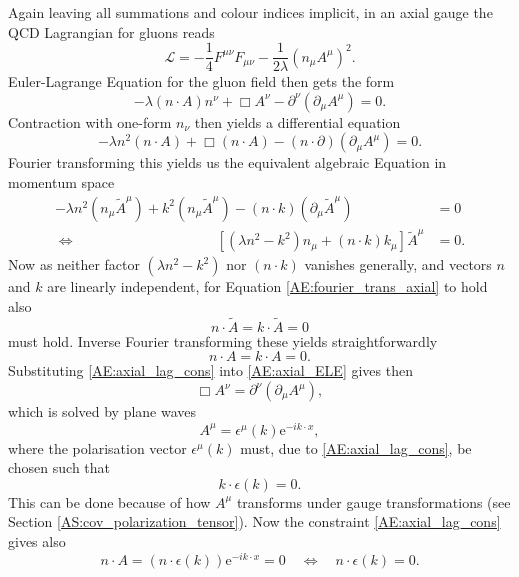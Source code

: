 \documentclass[a4paper, twoside, english, 12pt]{report}
\begin{document}
Again leaving all summations and colour indices implicit, in an axial gauge the QCD Lagrangian for gluons reads
\begin{equation}
	\mathcal{L} = - \frac{1}{4}F^{\mu\nu}F_{\mu\nu} - \frac{1}{2\lambda}(n_\mu A^\mu)^2.
\end{equation}
Euler-Lagrange Equation for the gluon field then gets the form
\begin{equation}\label{AE:axial_ELE}
	-\lambda\left(n\cdot A\right)n^\nu + \Box A^\nu -\partial^\nu\left(\partial_\mu A^\mu\right)= 0.
\end{equation}
Contraction with one-form $n_\nu$ then yields a differential equation
\begin{equation}
-\lambda n^2\left(n\cdot A\right) + \Box \left(n\cdot A\right) -\left(n\cdot\partial\right)\left(\partial_\mu A^\mu\right)= 0.
\end{equation}
Fourier transforming this yields us the equivalent algebraic Equation in momentum space
\begin{align}\label{AE:fourier_trans_axial}
-\lambda n^2\left(n_\mu \tilde{A}^\mu\right) + k^2 \left(n_\mu \tilde{A}^\mu\right) -\left(n\cdot k\right)\left(\partial_\mu \tilde{A}^\mu\right) &= 0 \\[1em]
\Leftrightarrow  \qquad\qquad\qquad \qquad\qquad \left[(\lambda n^2-k^2)n_\mu + (n\cdot k)k_\mu\right]\tilde{A}^\mu &= 0.
\end{align}
Now as neither factor $(\lambda n^2-k^2)$ nor $(n\cdot k)$ vanishes generally, and vectors $n$ and $k$ are linearly independent, for Equation \eqref{AE:fourier_trans_axial} to hold also
\begin{equation}
	n\cdot \tilde{A} = 	k\cdot \tilde{A} = 0
\end{equation}
must hold. Inverse Fourier transforming these yields straightforwardly
\begin{equation}\label{AE:axial_lag_cons}
n\cdot A = 	k\cdot A = 0.
\end{equation}
Substituting \eqref{AE:axial_lag_cons} into \eqref{AE:axial_ELE} gives then
\begin{equation}
	\Box A^\nu= \partial^\nu\left(\partial_\mu A^\mu\right),
\end{equation}
which is solved by plane waves
\begin{equation}
	A^\mu = \epsilon^\mu(k)\text{e}^{-ik\cdot x},
\end{equation}
where the polarisation vector $\epsilon^\mu(k)$ must, due to \eqref{AE:axial_lag_cons}, be chosen such that 
\begin{equation}\label{AE:axial_pol_k}
	k\cdot \epsilon(k) = 0. 
\end{equation}
This can be done because of how $A^\mu$ transforms under gauge transformations (see Section \ref{AS:cov_polarization_tensor}). Now the constraint \eqref{AE:axial_lag_cons} gives also
\begin{equation}\label{AE:axial_pol_n}
	n\cdot A = \left(n\cdot \epsilon(k)\right)\text{e}^{-ik\cdot x} = 0 \quad \Leftrightarrow \quad n\cdot \epsilon(k) = 0.
\end{equation}
\end{document}

